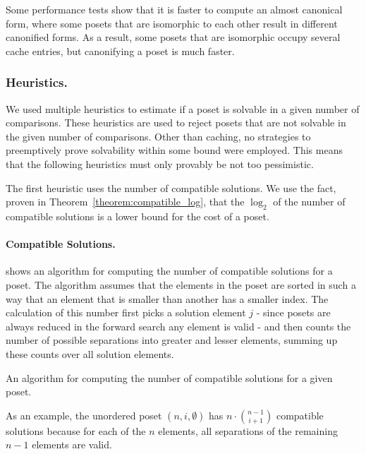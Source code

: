 \documentclass[twoside,leqno,twocolumn]{article}
\begin{document}
Some performance tests show that it is faster to compute an almost canonical form, where some posets that are isomorphic to each other result in different canonified forms.
As a result, some posets that are isomorphic occupy several cache entries, but canonifying a poset is much faster.

\subsubsection{Heuristics.}

We used multiple heuristics to estimate if a poset is solvable in a given number of comparisons.
These heuristics are used to reject posets that are not solvable in the given number of comparisons.
Other than caching, no strategies to preemptively prove solvability within some bound were employed.
This means that the following heuristics must only provably be not too pessimistic. %

The first heuristic uses the number of compatible solutions.
We use the fact, proven in Theorem~\ref{theorem:compatible_log}, that the $\log_2$ of the number of compatible solutions is a lower bound for the cost of a poset.

\paragraph{Compatible Solutions.}
 shows an algorithm for computing the number of compatible solutions for a poset.
The algorithm assumes that the elements in the poset are sorted in such a way that an element that is smaller than another has a smaller index.
The calculation of this number first picks a solution element $j$ - since posets are always reduced in the forward search any element is valid - and then counts the number of possible separations into greater and lesser elements, summing up these counts over all solution elements.

\begin{algorithm}[t]
  \centering
  
  \caption{An algorithm for computing the number of compatible solutions for a given poset.}
  \label{algo:compatible_solutions}
\end{algorithm}

As an example, the unordered poset $(n,i,\emptyset)$ has $n \cdot \binom{n - 1}{i + 1}$ compatible solutions because for each of the $n$ elements, all separations of the remaining $n - 1$ elements are valid.
\end{document}
